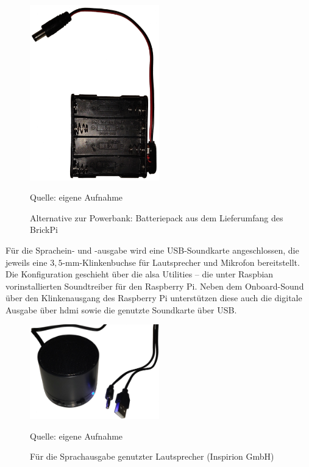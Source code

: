 \begin{figure}
	\centering
	\includegraphics[angle=90,width=0.5\textwidth]{../Images/batteriepack.png}
	\vspace{0.5em}
	\parbox[c]{0.8\linewidth}{\footnotesize
		\centering
		\vspace{1em}
		Quelle: eigene Aufnahme
	}
	\caption{Alternative zur Powerbank: Batteriepack aus dem Lieferumfang des BrickPi}
	\label{fig:batteriepack}
\end{figure}

Für die Sprachein- und -ausgabe wird eine USB-Soundkarte angeschlossen, die jeweils eine $3{,}5$-mm-Klinkenbuchse für Lautsprecher und Mikrofon bereitstellt.
Die Konfiguration geschieht über die \acf{alsa} Utilities -- die unter Raspbian vorinstallierten Soundtreiber für den Raspberry Pi.
Neben dem Onboard-Sound über den Klinkenausgang des Raspberry Pi unterstützen diese auch die digitale Ausgabe über \acf{hdmi} sowie die genutzte Soundkarte über USB. \cite{molloy2016}

\begin{figure}
	\centering
	\includegraphics[width=0.5\textwidth]{../Images/lautsprecher.png}
	\vspace{0.5em}
	\parbox[c]{0.8\linewidth}{\footnotesize
		\centering
		\vspace{1em}
		Quelle: eigene Aufnahme
	}
	\caption{Für die Sprachausgabe genutzter Lautsprecher (Inspirion GmbH)}
	\label{fig:lautsprecher}
\end{figure}

